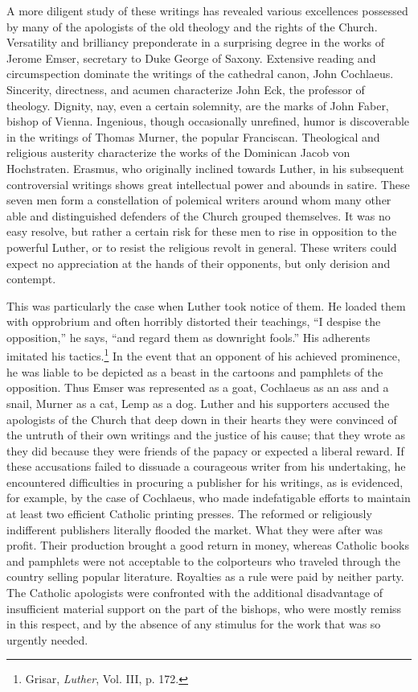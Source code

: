 A more diligent study of these writings has revealed various excellences
possessed by many of the apologists of the old theology and
the rights of the Church. Versatility and brilliancy preponderate in
a surprising degree in the works of Jerome Emser, secretary to Duke
George of Saxony. Extensive reading and circumspection dominate
the writings of the cathedral canon, John Cochlaeus. Sincerity, directness, and acumen characterize John Eck, the professor of theology.
Dignity, nay, even a certain solemnity, are the marks of John Faber,
bishop of Vienna. Ingenious, though occasionally unrefined, humor is
discoverable in the writings of Thomas Murner, the popular Franciscan. Theological and religious austerity characterize the works of
the Dominican Jacob von Hochstraten. Erasmus, who originally
inclined towards Luther, in his subsequent controversial writings
shows great intellectual power and abounds in satire. These seven men
form a constellation of polemical writers around whom many other
able and distinguished defenders of the Church grouped themselves.
It was no easy resolve, but rather a certain risk for these men to
rise in opposition to the powerful Luther, or to resist the religious
revolt in general. These writers could expect no appreciation at the
hands of their opponents, but only derision and contempt.

This was particularly the case when Luther took notice of them. He
loaded them with opprobrium and often horribly distorted their teachings,
“I despise the opposition,” he says, “and regard them as downright fools.”
His adherents imitated his tactics.\footnote{Grisar, \textit{Luther}, Vol. III, p. 172.}
In the event that an opponent of his
achieved prominence, he was liable to be depicted as a beast in the cartoons
and pamphlets of the opposition. Thus Emser was represented as a goat,
Cochlaeus as an ass and a snail, Murner as a cat, Lemp as a dog. Luther and
his supporters accused the apologists of the Church that deep down in their
hearts they were convinced of the untruth of their own writings and the
justice of his cause; that they wrote as they did because they were friends of
the papacy or expected a liberal reward. If these accusations failed to dissuade
a courageous writer from his undertaking, he encountered difficulties in
procuring a publisher for his writings, as is evidenced, for example, by the case
of Cochlaeus, who made indefatigable efforts to maintain at least two efficient
Catholic printing presses. The reformed or religiously indifferent publishers
literally flooded the market. What they were after was profit. Their production
brought a good return in money, whereas Catholic books and pamphlets
were not acceptable to the colporteurs who traveled through the country
selling popular literature. Royalties as a rule were paid by neither party. The
Catholic apologists were confronted with the additional disadvantage of insufficient
material support on the part of the bishops, who were mostly remiss in
this respect, and by the absence of any stimulus for the work that
was so urgently needed.

